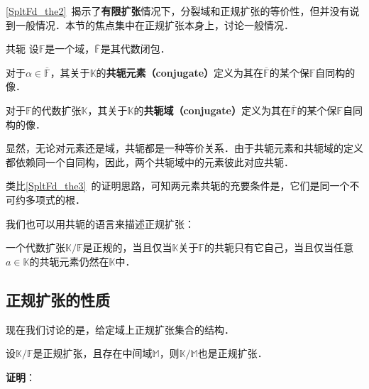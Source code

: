 

\autoref{SpltFd_the2}~揭示了\textbf{有限扩张}情况下，分裂域和正规扩张的等价性，但并没有说到一般情况．本节的焦点集中在正规扩张本身上，讨论一般情况．


\begin{definition}{共轭}
设$\mathbb{F}$是一个域，$\overline{\mathbb{F}}$是其代数闭包．

对于$\alpha\in\overline{\mathbb{F}}$，其关于$\mathbb{K}$的\textbf{共轭元素（conjugate）}定义为其在$\overline{\mathbb{F}}$的某个保$\mathbb{F}$自同构的像．

对于$\mathbb{F}$的代数扩张$\mathbb{K}$，其关于$\mathbb{K}$的\textbf{共轭域（conjugate）}定义为其在$\overline{\mathbb{F}}$的某个保$\mathbb{F}$自同构的像．
\end{definition}

显然，无论对元素还是域，共轭都是一种等价关系．由于共轭元素和共轭域的定义都依赖同一个自同构，因此，两个共轭域中的元素彼此对应共轭．

类比\autoref{SpltFd_the3}~的证明思路，可知两元素共轭的充要条件是，它们是同一个不可约多项式的根．

我们也可以用共轭的语言来描述正规扩张：

\begin{theorem}{}\label{NomEx_the1}
一个代数扩张$\mathbb{K}/\mathbb{F}$是正规的，当且仅当$\mathbb{K}$关于$\mathbb{F}$的共轭只有它自己，当且仅当任意$a\in\mathbb{K}$的共轭元素仍然在$\mathbb{K}$中．
\end{theorem}



\subsection{正规扩张的性质}

现在我们讨论的是，给定域上正规扩张集合的结构．

\begin{theorem}{}\label{NomEx_the6}
设$\mathbb{K}/\mathbb{F}$是正规扩张，且存在中间域$\mathbb{M}$，则$\mathbb{K}/\mathbb{M}$也是正规扩张．
\end{theorem}

\textbf{证明}：


